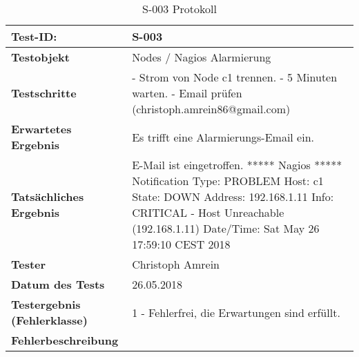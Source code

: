 \begin{table}[H]
\centering
\begin{tabular}{p{4.5cm}p{11.5cm}}
\hline
\cellcolor{heading}\textbf{Test-ID:} & S-003 \\\hline
\cellcolor{heading}\textbf{Testobjekt} & Nodes / Nagios Alarmierung\\\hline
\cellcolor{heading}\textbf{Testschritte} & 
- Strom von Node c1 trennen. \newline
- 5 Minuten warten. \newline
- Email prüfen (christoph.amrein86@gmail.com) \\\hline
\cellcolor{heading}\textbf{Erwartetes Ergebnis} & Es trifft eine Alarmierungs-Email ein. \\\hline
\cellcolor{heading}\textbf{Tatsächliches Ergebnis} &
E-Mail ist eingetroffen. \newline
***** Nagios ***** \newline
Notification Type: PROBLEM \newline
Host: c1 \newline
State: DOWN \newline
Address: 192.168.1.11 \newline
Info: CRITICAL - Host Unreachable (192.168.1.11) \newline
Date/Time: Sat May 26 17:59:10 CEST 2018 \newline
 \\\hline
\cellcolor{heading}\textbf{Tester} & Christoph Amrein  \\\hline
\cellcolor{heading}\textbf{Datum des Tests} & 26.05.2018  \\\hline
\cellcolor{heading}\textbf{Testergebnis \newline (Fehlerklasse)} & 1 - Fehlerfrei, die Erwartungen sind erfüllt. \\\hline
\cellcolor{heading}\textbf{Fehlerbeschreibung} &\\\hline
\end{tabular}
\caption{S-003 Protokoll}
\end{table}

